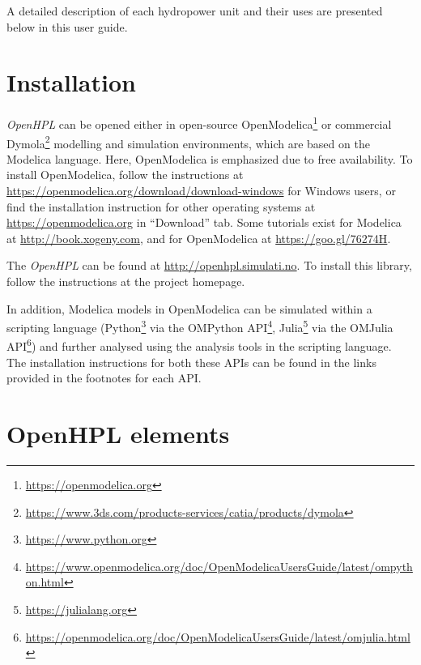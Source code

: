 \documentclass[%
]{USN-PhD}
\begin{document}
A detailed description of each hydropower unit and their uses are presented below in this user guide.

\chapter{Installation}

\emph{OpenHPL} can be opened either in open-source OpenModelica\footnote{\url{https://openmodelica.org}} or commercial Dymola\footnote{\url{https://www.3ds.com/products-services/catia/products/dymola}} modelling and simulation environments, which are based on the Modelica language. Here, OpenModelica is emphasized due to free availability. To install OpenModelica, follow the instructions at \url{https://openmodelica.org/download/download-windows} for Windows users, or find the installation instruction for other operating systems at \url{https://openmodelica.org} in ``Download'' tab. Some tutorials exist for Modelica at \url{http://book.xogeny.com}, and for OpenModelica at \url{https://goo.gl/76274H}.

The \emph{OpenHPL} can be found at \url{http://openhpl.simulati.no}. To install this library, follow the instructions at the project homepage.

In addition, Modelica models in OpenModelica can be simulated within a scripting language (Python\footnote{\url{https://www.python.org}} via the OMPython API\footnote{\url{https://www.openmodelica.org/doc/OpenModelicaUsersGuide/latest/ompython.html}}, Julia\footnote{\url{https://julialang.org}} via the OMJulia API\footnote{\url{https://openmodelica.org/doc/OpenModelicaUsersGuide/latest/omjulia.html}}) and further analysed using the analysis tools in the scripting language. The installation instructions for both these APIs can be found in the links provided in the footnotes for each API.

\chapter{OpenHPL elements}
\end{document}
